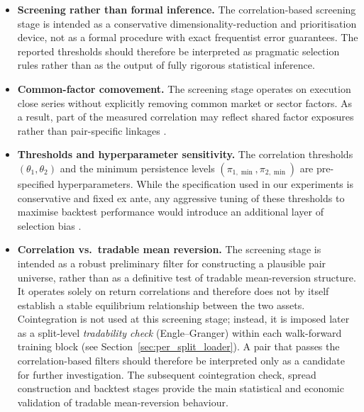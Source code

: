 \documentclass[11pt,a4paper]{article}
\begin{document}
\begin{itemize}[noitemsep]
  \item \textbf{Screening rather than formal inference.}
        The correlation-based screening stage is intended as a conservative
        dimensionality-reduction and prioritisation device, not as a formal
         procedure with exact frequentist error guarantees.
        The reported thresholds should therefore be interpreted as pragmatic
        selection rules rather than as the output of fully rigorous statistical
        inference.

  \item \textbf{Common-factor comovement.}
        The screening stage operates on execution close series without
        explicitly removing common market or sector factors. As a result, part
        of the measured correlation may reflect shared factor exposures rather
        than pair-specific linkages \cite{fama1993common}.

  \item \textbf{Thresholds and hyperparameter sensitivity.}
        The correlation thresholds \((\theta_1,\theta_2)\) and the minimum
        persistence levels \((\pi_{1,\min}, \pi_{2,\min})\) are pre-specified
        hyperparameters. While the specification used in our experiments is
        conservative and fixed ex ante, any aggressive tuning of these
        thresholds to maximise backtest performance would introduce an
        additional layer of selection bias
        \cite{harvey2016and,bailey2017probability}.

  \item \textbf{Correlation vs.\ tradable mean reversion.}
        The screening stage is intended as a robust preliminary filter for
        constructing a plausible pair universe, rather than as a definitive test
        of tradable mean-reversion structure. It operates solely on return
        correlations and therefore does not by itself establish a stable
        equilibrium relationship between the two assets. Cointegration is not
        used at this screening stage; instead, it is imposed later as a
        split-level \emph{tradability check} (Engle--Granger) within each
        walk-forward training block (see Section~\ref{sec:per_split_loader}).
        A pair that passes the correlation-based filters should therefore be
        interpreted only as a candidate for further investigation. The
        subsequent cointegration check, spread construction and backtest stages
        provide the main statistical and economic validation of tradable
        mean-reversion behaviour.
\end{itemize}
\end{document}
